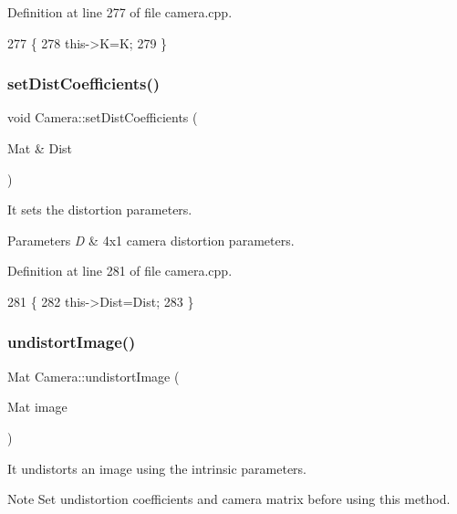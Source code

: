 Definition at line 277 of file camera.\+cpp.


\begin{DoxyCode}
277                                    \{
278     this->K=K;
279 \}
\end{DoxyCode}
\mbox{\label{classCamera_a018fb29ce30458045b22eeee47f61057}} 
\subsubsection{\texorpdfstring{set\+Dist\+Coefficients()}{setDistCoefficients()}}
{\footnotesize\ttfamily void Camera\+::set\+Dist\+Coefficients (\begin{DoxyParamCaption}\item[{Mat \&}]{Dist }\end{DoxyParamCaption})}



It sets the distortion parameters. 


\begin{DoxyParams}{Parameters}
{\em D} & 4x1 camera distortion parameters. \\
\hline
\end{DoxyParams}


Definition at line 281 of file camera.\+cpp.


\begin{DoxyCode}
281                                           \{
282     this->Dist=Dist;
283 \}
\end{DoxyCode}
\mbox{\label{classCamera_ae261c6f36e0b9c6aa40917b60ae7b1fa}} 
\subsubsection{\texorpdfstring{undistort\+Image()}{undistortImage()}}
{\footnotesize\ttfamily Mat Camera\+::undistort\+Image (\begin{DoxyParamCaption}\item[{Mat}]{image }\end{DoxyParamCaption})}



It undistorts an image using the intrinsic parameters. 

\begin{DoxyNote}{Note}
Set undistortion coefficients and camera matrix before using this method. 
\end{DoxyNote}

